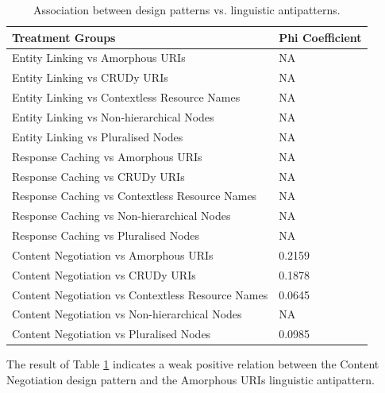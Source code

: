 \begin{table}[ht!]
    \centering
    \small
  \begin{tabular}{|l|l|}
\hline \textbf{Treatment Groups} & \textbf{Phi Coefficient} 
\\ \hline 
Entity Linking vs Amorphous URIs & NA
\\ \hline 
Entity Linking vs CRUDy URIs & NA
\\ \hline 
Entity Linking vs Contextless Resource Names & NA
\\ \hline 
Entity Linking vs Non-hierarchical Nodes & NA
\\ \hline 
Entity Linking vs Pluralised Nodes & NA
\\ \hline
Response Caching vs Amorphous URIs & NA
\\ \hline 
Response Caching vs CRUDy URIs & NA
\\ \hline 
Response Caching vs Contextless Resource Names & NA
\\ \hline 
Response Caching vs Non-hierarchical Nodes & NA
\\ \hline 
Response Caching vs Pluralised Nodes & NA
\\ \hline
Content Negotiation vs Amorphous URIs & 0.2159
\\ \hline 
Content Negotiation vs CRUDy URIs & 0.1878
\\ \hline 
Content Negotiation vs Contextless Resource Names & 0.0645
\\ \hline 
Content Negotiation vs Non-hierarchical Nodes & NA
\\ \hline 
Content Negotiation vs Pluralised Nodes & 0.0985
\\ \hline 
  \end{tabular}
    \caption{Association between design patterns vs. linguistic antipatterns.}
    \label{tab:Designpatternsvslinguisticantipatterns}
\end{table}

The result of Table \ref{tab:Designpatternsvslinguisticantipatterns} indicates a weak positive relation between the  Content Negotiation design pattern and the  Amorphous URIs linguistic antipattern.

\newpage